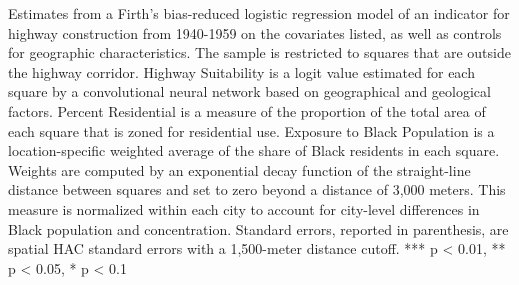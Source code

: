 \begin{table}[h]
\begin{threeparttable}
\begin{tablenotes}[flushleft]
\item Estimates from a Firth's bias-reduced logistic regression model of an indicator for highway construction from 1940-1959 on the covariates listed, as well as controls for geographic characteristics. The sample is restricted to squares that are outside the highway corridor. Highway Suitability is a logit value estimated for each square by a convolutional neural network based on geographical and geological factors. Percent Residential is a measure of the proportion of the total area of each square that is zoned for residential use. Exposure to Black Population is a location-specific weighted average of the share of Black residents in each square. Weights are computed by an exponential decay function of the straight-line distance between squares and set to zero beyond a distance of 3,000 meters. This measure is normalized within each city to account for city-level differences in Black population and concentration. Standard errors, reported in parenthesis, are \textcite{conley_gmm_1999} spatial HAC standard errors with a 1,500-meter distance cutoff.  *** p < 0.01, ** p < 0.05, * p < 0.1
\end{tablenotes}
\end{threeparttable}
\end{table}
